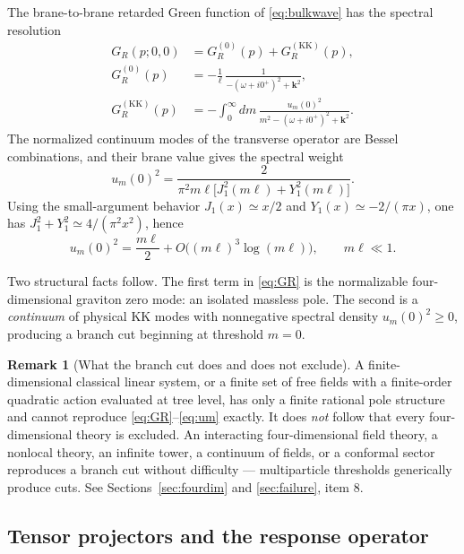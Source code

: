 \documentclass[11pt,a4paper]{article}
\theoremstyle{plain}
\theoremstyle{definition}
\newtheorem{remark}[theorem]{Remark}
\newcommand{\KK}{\mathrm{KK}}
\begin{document}
The brane-to-brane retarded Green function of \eqref{eq:bulkwave} has the
spectral resolution
\begin{equation}
\label{eq:GR}
\boxed{\;
\begin{aligned}
G_R(p;0,0)
&=G_R^{(0)}(p)+G_R^{(\KK)}(p),\\
G_R^{(0)}(p)
&=-\frac{1}{\ell}\,
\frac{1}{-(\omega+i0^+)^2+\mathbf k^2},\\
G_R^{(\KK)}(p)
&=-\int_0^\infty dm\,
\frac{u_m(0)^2}{m^2-(\omega+i0^+)^2+\mathbf k^2} .
\end{aligned}
\;}
\end{equation}
The normalized continuum modes of the transverse operator are Bessel
combinations, and their brane value gives the spectral weight
\begin{equation}
\label{eq:um}
\boxed{\;
u_m(0)^2
=\frac{2}{\pi^2 m\ell\bigl[J_1^2(m\ell)+Y_1^2(m\ell)\bigr]} .
\;}
\end{equation}
Using the small-argument behavior
$J_1(x)\simeq x/2$ and $Y_1(x)\simeq-2/(\pi x)$, one has
$J_1^2+Y_1^2\simeq 4/(\pi^2x^2)$, hence
\begin{equation}
\label{eq:umsmall}
u_m(0)^2
=\frac{m\ell}{2}
+O\bigl((m\ell)^3\log(m\ell)\bigr),
\qquad m\ell\ll1 .
\end{equation}

Two structural facts follow. The first term in \eqref{eq:GR} is the
normalizable four-dimensional graviton zero mode: an isolated massless
pole. The second is a \emph{continuum} of physical KK modes with
nonnegative spectral density $u_m(0)^2\ge0$, producing a branch cut
beginning at threshold $m=0$.

\begin{remark}[What the branch cut does and does not exclude]
\label{rem:cut}
A finite-dimensional classical linear system, or a finite set of free
fields with a finite-order quadratic action evaluated at tree level, has
only a finite rational pole structure and cannot reproduce
\eqref{eq:GR}--\eqref{eq:um} exactly. It does \emph{not} follow that
every four-dimensional theory is excluded. An interacting four-dimensional
field theory, a nonlocal theory, an infinite tower, a continuum of
fields, or a conformal sector reproduces a branch cut without difficulty
--- multiparticle thresholds generically produce cuts. See
Sections~\ref{sec:fourdim} and \ref{sec:failure}, item 8.
\end{remark}

\subsection{Tensor projectors and the response operator}
\label{sec:projectors}
\end{document}
